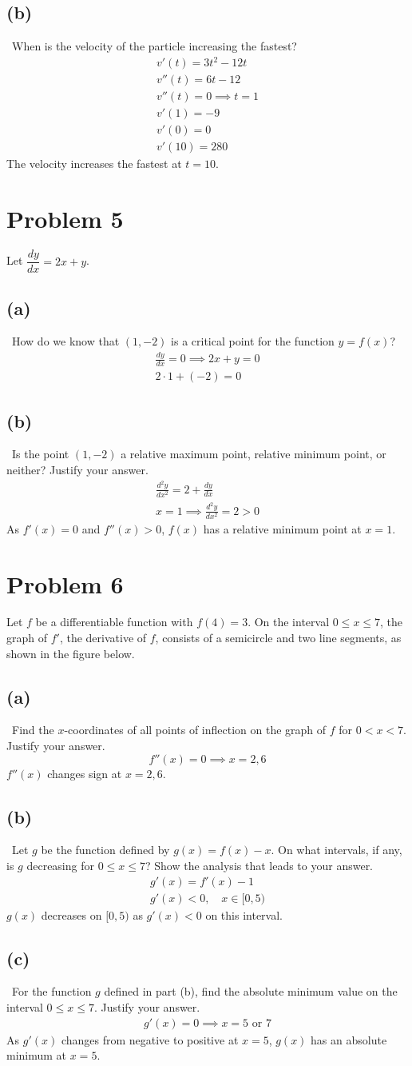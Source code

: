 \documentclass[12pt]{article}
\newcommand{\dydx}{\frac{dy}{dx}}
\newcommand{\tor}{\text{ or }}
\newcommand{\vem}{\vspace{0.5em}}
\newcommand{\problem}[1]{\section{Problem #1}}
\newcommand{\subproblem}[1]{\subsection{(#1)} \,}
\begin{document}
\subproblem{b}
When is the velocity of the particle increasing the fastest?
\begin{gather*}
    v'(t)=3t^2-12t\\
    v''(t)=6t-12\\
    v''(t)=0 \implies t=1\\
    v'(1)=-9\\
    v'(0)=0\\
    v'(10)=280
\end{gather*}
The velocity increases the fastest at $t=10$. \vem

\problem{5}
Let $\dfrac{dy}{dx}=2x+y$. \vem

\subproblem{a}
How do we know that $(1,-2)$ is a critical point for the function $y=f(x)$?
\begin{gather*}
    \dydx=0 \implies 2x+y=0\\
    \boxed{2\cdot 1+(-2)=0}
\end{gather*}

\subproblem{b}
Is the point $(1,-2)$ a relative maximum point, relative minimum point, or neither? Justify your answer.
\begin{gather*}
    \frac{d^2y}{dx^2}=2+\dydx\\
    x=1 \implies \frac{d^2y}{dx^2}=2>0
\end{gather*}
As $f'(x)=0$ and $f''(x)>0$, $f(x)$ has a relative minimum point at $x=1$. \vem

\problem{6}
Let $f$ be a differentiable function with $f(4)=3$. On the interval $0\le x \le 7$, the graph of $f'$, the derivative of $f$, consists of a semicircle and two line segments, as shown in the figure below. \vem

\subproblem{a}
Find the $x$-coordinates of all points of inflection on the graph of $f$ for $0<x<7$. Justify your answer.
\[
f''(x)=0 \implies \boxed{x=2,6}
\]
$f''(x)$ changes sign at $x=2,6$. \vem

\subproblem{b}
Let $g$ be the function defined by $g(x)=f(x)-x$. On what intervals, if any, is $g$ decreasing for $0\le x\le 7$? Show the analysis that leads to your answer.
\begin{gather*}
    g'(x)=f'(x)-1\\
    g'(x)<0, \quad x\in [0,5)
\end{gather*}
$g(x)$ decreases on $[0,5)$ as $g'(x)<0$ on this interval. \vem

\subproblem{c}
For the function $g$ defined in part (b), find the absolute minimum value on the interval $0\le x\le 7$. Justify your answer. 
\begin{gather*}
    g'(x)=0 \implies x=5 \tor 7
\end{gather*}
As $g'(x)$ changes from negative to positive at $x=5$, $g(x)$ has an absolute minimum at $x=5$. \vem
\end{document}
